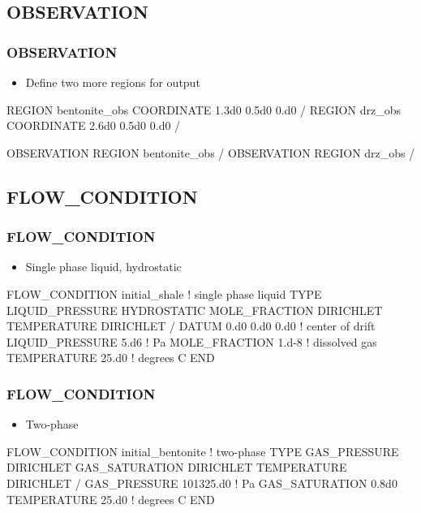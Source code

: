 \documentclass{beamer}
\newcommand\bluecomment[1]{{{\color{blue} #1}}}
\begin{document}
\subsection{OBSERVATION}

\begin{frame}[fragile]\frametitle{OBSERVATION}
\begin{itemize}
  \item{Define two more regions for output}
\end{itemize}

\begin{semiverbatim}\small
REGION bentonite_obs
  COORDINATE 1.3d0 0.5d0 0.d0
/
REGION drz_obs
  COORDINATE 2.6d0 0.5d0 0.d0
/

OBSERVATION
  REGION bentonite_obs
/
OBSERVATION
  REGION drz_obs
/
\end{semiverbatim}
\end{frame}

\subsection{FLOW\_CONDITION}

\begin{frame}[fragile]\frametitle{FLOW\_CONDITION}
\begin{itemize}
  \item{Single phase liquid, hydrostatic}
\end{itemize}

\begin{semiverbatim}
FLOW_CONDITION initial_shale \bluecomment{! single phase liquid}
  TYPE
    LIQUID_PRESSURE HYDROSTATIC
    MOLE_FRACTION DIRICHLET
    TEMPERATURE DIRICHLET
  /
  DATUM 0.d0 0.d0 0.d0 \bluecomment{! center of drift}
  LIQUID_PRESSURE 5.d6 \bluecomment{! Pa}
  MOLE_FRACTION 1.d-8 \bluecomment{! dissolved gas}
  TEMPERATURE 25.d0 \bluecomment{! degrees C}
END
\end{semiverbatim}
\end{frame}

\begin{frame}[fragile]\frametitle{FLOW\_CONDITION}
\begin{itemize}
  \item{Two-phase}
\end{itemize}

\begin{semiverbatim}
FLOW_CONDITION initial_bentonite \bluecomment{! two-phase}
  TYPE
    GAS_PRESSURE DIRICHLET
    GAS_SATURATION DIRICHLET
    TEMPERATURE DIRICHLET
  /
  GAS_PRESSURE 101325.d0 \bluecomment{! Pa}
  GAS_SATURATION 0.8d0
  TEMPERATURE 25.d0 \bluecomment{! degrees C}
END
\end{semiverbatim}
\end{frame}
\end{document}
